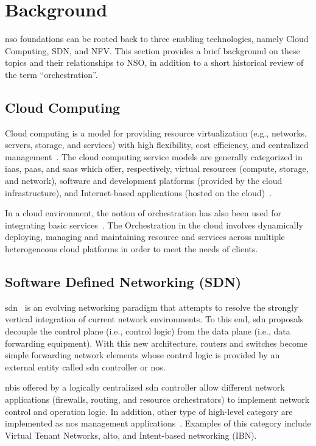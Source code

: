 \section{Background}
\label{sec:background}

\gls{nso} foundations can be rooted back to three enabling technologies, namely Cloud Computing, SDN, and NFV. This section provides a brief background on these topics and their relationships to NSO, in addition to a short historical review of the term ``orchestration''.

\subsection{Cloud Computing}
Cloud computing is a model for providing resource virtualization (e.g., networks, servers, storage, and services) with high flexibility, cost efficiency, and centralized management~\cite{Le2016SurveyNetworks}. The cloud computing service models are generally categorized in \gls{iaas}, \gls{paas}, and \gls{saas} which offer, respectively,  virtual resources (compute, storage, and network), software and development platforms (provided by the cloud infrastructure), and Internet-based applications (hosted on the cloud)~\cite{bele2018empirical}.

In a cloud environment, the notion of orchestration has also been used for integrating basic services~\cite{Vouk2008CloudImplementations}. The Orchestration in the cloud involves dynamically deploying, managing and maintaining resource and services across multiple heterogeneous cloud platforms in order to meet the needs of clients. 

\subsection{Software Defined Networking (SDN)}

\gls{sdn}~\cite{surveySDN} is an evolving networking paradigm that attempts to resolve the strongly vertical integration of current network environments. To this end, \gls{sdn} proposals decouple the control plane (i.e., control logic) from the data plane (i.e., data forwarding equipment). With this new architecture, routers and switches become simple forwarding network elements whose control logic is provided by an external entity called \gls{sdn} controller or \gls{nos}. 

\glspl{nbi} offered by a logically centralized \gls{sdn} controller allow different network applications (firewalls, routing, and resource orchestrators) to implement network control and operation logic. In addition, other type of high-level  category are implemented as \gls{nos} management applications~\cite{Rotsos2017NetworkSurvey}. Examples of this category include Virtual Tenant Networks, \gls{alto}, and Intent-based networking (IBN).

